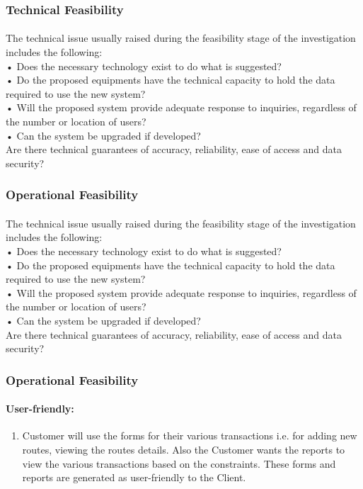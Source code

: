 \subsubsection{Technical Feasibility}
\paragraph{} The technical issue usually raised during the feasibility stage of the investigation includes the following:\\
•	Does the necessary technology exist to do what is suggested?\\
•	Do the proposed equipments have the technical capacity to hold the data required to use the new system?\\
•	Will the proposed system provide adequate response to inquiries, regardless of the number or location of users?\\
•	Can the system be upgraded if developed?\\
Are there technical guarantees of accuracy, reliability, ease of access and data security?

\subsubsection{Operational Feasibility}
\paragraph{} The technical issue usually raised during the feasibility stage of the investigation includes the following:\\
•	Does the necessary technology exist to do what is suggested?\\
•	Do the proposed equipments have the technical capacity to hold the data required to use the new system?\\
•	Will the proposed system provide adequate response to inquiries, regardless of the number or location of users?\\
•	Can the system be upgraded if developed?\\
Are there technical guarantees of accuracy, reliability, ease of access and data security?

\subsubsection{Operational Feasibility}
\paragraph{User-friendly: }
\begin{enumerate}
\item Customer will use the forms for their various transactions i.e. for adding new routes, viewing the routes details. Also the Customer wants the reports to view the various transactions based on the constraints. These forms and reports are generated as user-friendly to the Client.\\
\end{enumerate}

